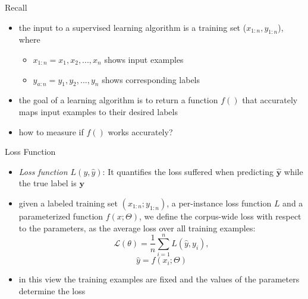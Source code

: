 \begin{frame}{Recall}
    \begin{itemize}
        \item<1-> the input to a supervised learning algorithm is a training set ($x_{1:n}, y_{1:n}$), where
        \begin{itemize}
            \item<2-> $x_{1:n} = x_1,x_2,..., x_n$ shows input examples
            \item<3->  $y_{a:n}= y_1, y_2, ..., y_n$ shows corresponding labels
        \end{itemize}
        \item<4-> the goal of a learning algorithm is to return a function $f()$ that accurately maps input examples to their desired labels
        \item<6-> how to measure if $f()$ works accurately?  
    \end{itemize}
\end{frame}
\begin{frame}{Loss Function}
\begin{itemize}
    \item<1->  \emph{Loss function $L(y,\hat{y})$}: It quantifies the loss suffered when predicting $\hat{\mathbf{y}}$ while the true label is $\mathbf{y}$
    
    \item<2-> given a labeled training set $(x_{1:n};y_{1:n})$, a per-instance loss function $L$ and a parameterized function $f(x;\Theta)$, we define the corpus-wide loss with respect to the parameters‚ as the average loss over all training examples:
    \begin{equation*}
        \mathcal{L}(\theta) = \frac{1}{n}\sum_{i=1}^{n}L(\hat{y},y_i),
    \end{equation*}
        \begin{equation*}
        \hat{y} = f(x_i;\Theta)
    \end{equation*}
\item<3-> in this view the training examples are fixed and the values of the parameters determine the loss
\end{itemize}
\end{frame}
